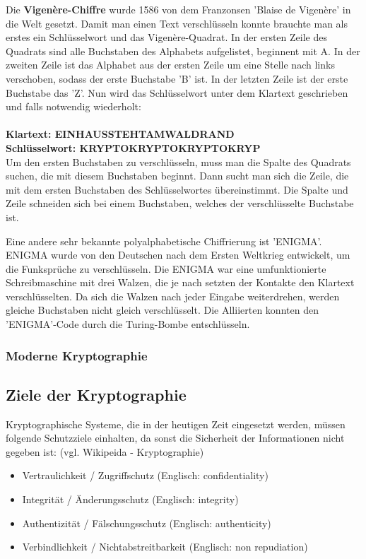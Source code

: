 \documentclass[11pt,a4paper]{report}
\begin{document}
Die \textbf{Vigenère-Chiffre} wurde 1586 von dem Franzonsen 'Blaise de Vigenère' in die Welt gesetzt. Damit man einen Text verschlüsseln konnte brauchte man als erstes ein Schlüsselwort und das Vigenère-Quadrat. In der ersten Zeile des Quadrats sind alle Buchstaben des Alphabets aufgelistet, beginnent mit A. In der zweiten Zeile ist das Alphabet aus der ersten Zeile um eine Stelle nach links verschoben, sodass der erste Buchstabe 'B' ist. In der letzten Zeile ist der erste Buchstabe das 'Z'. Nun wird das Schlüsselwort unter dem Klartext geschrieben und falls notwendig wiederholt:\\\\

\textbf{Klartext:      EINHAUSSTEHTAMWALDRAND}\\
\textbf{Schlüsselwort: KRYPTOKRYPTOKRYPTOKRYP}\\

Um den ersten Buchstaben zu verschlüsseln, muss man die Spalte des Quadrats suchen, die mit diesem Buchstaben beginnt. Dann sucht man sich die Zeile, die mit dem ersten Buchstaben des Schlüsselwortes übereinstimmt. Die Spalte und Zeile schneiden sich bei einem Buchstaben, welches der verschlüsselte Buchstabe ist.

Eine andere sehr bekannte polyalphabetische Chiffrierung ist 'ENIGMA'. ENIGMA wurde von den Deutschen nach dem Ersten Weltkrieg entwickelt, um die Funksprüche zu verschlüsseln. Die ENIGMA war eine umfunktionierte Schreibmaschine mit drei Walzen, die je nach setzten der Kontakte den Klartext verschlüsselten. Da sich die Walzen nach jeder Eingabe weiterdrehen, werden gleiche Buchstaben nicht gleich verschlüsselt. Die Alliierten konnten den 'ENIGMA'-Code durch die Turing-Bombe entschlüsseln.

\subsubsection{Moderne Kryptographie}

\subsection{Ziele der Kryptographie}

Kryptographische Systeme, die in der heutigen Zeit eingesetzt werden, müssen folgende Schutzziele einhalten, da sonst die Sicherheit der Informationen nicht gegeben ist: (vgl. Wikipeida - Kryptographie)

\begin{itemize}
\item Vertraulichkeit / Zugriffschutz (Englisch: confidentiality)
\item Integrität / Änderungsschutz  (Englisch: integrity) 
\item Authentizität / Fälschungsschutz (Englisch: authenticity)
\item Verbindlichkeit / Nichtabstreitbarkeit (Englisch: non repudiation) 
\end{itemize}
\end{document}
